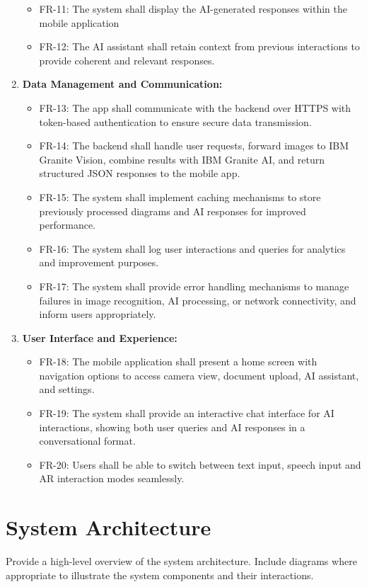 \documentclass[10pt]{article}
\begin{document}
\begin{enumerate}
\begin{itemize}
                \item FR-11: The system shall display the AI-generated responses within the mobile application
                \item FR-12: The AI assistant shall retain context from previous interactions to provide coherent and relevant responses.
            \end{itemize}
        \item \textbf{Data Management and Communication:}
            \begin{itemize}
                \item FR-13: The app shall communicate with the backend over HTTPS with token-based authentication to ensure secure data transmission.
                \item FR-14: The backend shall handle user requests, forward images to IBM Granite Vision, combine results with IBM Granite AI, and return structured JSON responses to the mobile app.
                \item FR-15: The system shall implement caching mechanisms to store previously processed diagrams and AI responses for improved performance.
                \item FR-16: The system shall log user interactions and queries for analytics and improvement purposes.
                \item FR-17: The system shall provide error handling mechanisms to manage failures in image recognition, AI processing, or network connectivity, and inform users appropriately.
            \end{itemize}
        \item \textbf{User Interface and Experience:}
            \begin{itemize}
                \item FR-18: The mobile application shall present a home screen with navigation options to access camera view, document upload, AI assistant, and settings.
                \item FR-19: The system shall provide an interactive chat interface for AI interactions, showing both user queries and AI responses in a conversational format.
                \item FR-20: Users shall be able to switch between text input, speech input and AR interaction modes seamlessly.
            \end{itemize}
    \end{enumerate}

\section{System Architecture}
Provide a high-level overview of the system architecture. Include diagrams where appropriate to illustrate the system components and their interactions.
\end{document}
